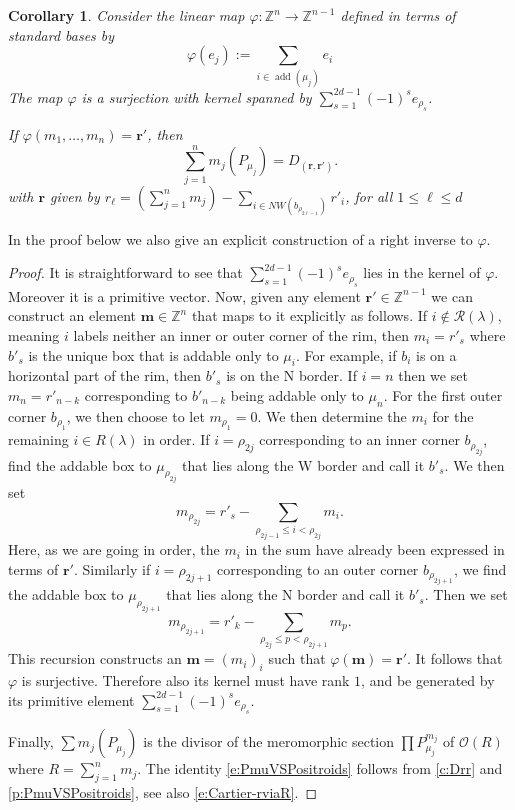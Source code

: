 \documentclass{amsart}
\newtheorem{corollary}[thm]{Corollary}
\theoremstyle{definition}
\numberwithin{equation}{section}
\newcommand{\Z}{\mathbb{Z}}
\begin{document}
\begin{corollary}\label{c:DrrVSPmu}
Consider the linear map $\varphi:\Z^{n}\to\Z^{n-1}$ defined in terms of standard bases by 
\[
\varphi(e_j):=\sum_{i\in\operatorname{add}(\mu_j)} e_i
\]
The map $\varphi$ is a surjection with kernel spanned by $\sum_{s=1}^{2d-1} (-1)^s e_{\rho_{s}}$. 

If $\varphi(m_1,\dotsc,m_n)=\mathbf r'$, then 
\begin{equation}\label{e:PmuVSPositroids}
\sum_{j=1}^n m_j(P_{\mu_j})=D_{(\mathbf r,\mathbf r')}.
\end{equation}
with $\mathbf r$  given by $r_\ell=(\sum_{j=1}^{n}m_j)-\sum_{i\in NW(b_{\rho_{2\ell-1}})}r'_i$, for all $1\le \ell\le d$
\end{corollary}
In the proof below we also give an explicit construction of a  right inverse to $\varphi$.
\begin{proof}
It is straightforward to see that $\sum_{s=1}^{2d-1} (-1)^s e_{\rho_{s}}$ lies in the kernel of $\varphi$. Moreover it is a primitive vector. Now, given any element $\mathbf r'\in\Z^{n-1}$ we can construct an element $\mathbf m\in\Z^n$ that maps to it explicitly as follows. If $i\notin \mathcal R(\lambda)$, meaning $i$ labels neither an inner or outer corner of the rim, then  $m_i=r'_s$ where $b'_s$ is the unique box that is addable only to $\mu_i$. For example, if $b_i$ is on a horizontal part of the rim, then $b'_s$ is on the N border. If $i=n$ then we set $m_n=r'_{n-k}$ corresponding to $b'_{n-k}$ being addable only to $\mu_n$. For the first outer corner $b_{\rho_1}$, we then choose to let $m_{\rho_{1}}=0$. We then determine the $m_i$ for the remaining $i\in R(\lambda)$ in order. If $i=\rho_{2j}$ corresponding to an inner corner $b_{\rho_{2j}}$, find the addable box to $\mu_{\rho_{2j}}$ that lies along the W border and call it $b'_s$. We then set 
\[
m_{\rho_{2j}}=r'_s-\sum_{\rho_{2j-1}\le i<\rho_{2j}} m_i.
\]
Here, as we are going in order, the $m_i$ in the sum have already been expressed in terms of $\mathbf r'$.
Similarly if $i=\rho_{2j+1}$ corresponding to an outer corner $b_{\rho_{2j+1}}$, we find the addable box to $\mu_{\rho_{2j+1}}$ that lies along the N border and call it $b'_s$. Then we set
\[
m_{\rho_{2j+1}}=r'_k-\sum_{\rho_{2j}\le p<\rho_{2j+1}}m_p.
\]
This recursion constructs an $\mathbf m=(m_i)_i$ such that $\varphi(\mathbf m)=\mathbf r'$. It follows that $\varphi$ is surjective. Therefore also its kernel must have rank $1$, and be generated by its primitive element $\sum_{s=1}^{2d-1} (-1)^s e_{\rho_{s}}$.

Finally, $\sum m_j(P_{\mu_j})$ is the divisor of the meromorphic section $\prod P_{\mu_j}^{m_j}$ of  $\mathcal O(R)$ where $R=\sum_{j=1}^n m_j$. The identity \eqref{e:PmuVSPositroids} follows from \cref{c:Drr} and \cref{p:PmuVSPositroids}, see also \eqref{e:Cartier-rviaR}.
\end{proof}
\end{document}
